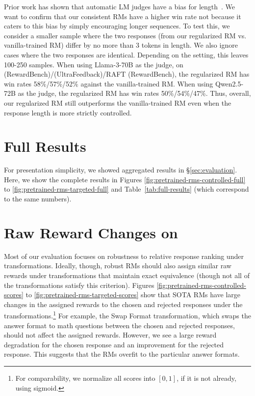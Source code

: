 Prior work has shown that automatic LM judges have a bias for length~\citep{wang2023how,singhal2023long}. We want to confirm that our consistent RMs have a higher win rate not because it caters to this bias by simply encouraging longer sequences.
To test this, we consider a smaller sample where the two responses (from our regularized RM vs. vanilla-trained RM) differ by no more than 3 tokens in length.
We also ignore cases where the two responses are identical.
Depending on the setting, this leaves 100-250 samples.
When using Llama-3-70B as the judge, on \bon (RewardBench)/\bon (UltraFeedback)/RAFT (RewardBench), the regularized RM has win rates 58\%/57\%/52\% against the vanilla-trained RM.
When using Qwen2.5-72B as the judge, the regularized RM has win rates 50\%/54\%/47\%.
Thus, overall, our regularized RM still outperforms the vanilla-trained RM even when the response length is more strictly controlled.

\section{Full \benchmark Results} \label{sec:full-results}

For presentation simplicity, we showed aggregated results in \S\ref{sec:evaluation}. Here, we show the complete results in Figures \ref{fig:pretrained-rms-controlled-full} to \ref{fig:pretrained-rms-targeted-full} and Table~\ref{tab:full-results} (which correspond to the same numbers).

\section{Raw Reward Changes on \benchmark} \label{sec:score-changes}

Most of our evaluation focuses on robustness to relative response ranking under \benchmark transformations.
Ideally, though, robust RMs should also assign similar raw rewards under transformations that maintain exact equivalence (though not all of the \benchmark transformations satisfy this criterion).
Figures \ref{fig:pretrained-rms-controlled-scores} to \ref{fig:pretrained-rms-targeted-scores} show that SOTA RMs have large changes in the assigned rewards to the chosen and rejected responses under the transformations.\footnote{For comparability, we normalize all scores into $[0, 1]$, if it is not already, using sigmoid.}
For example, the Swap Format transformation, which swaps the answer format to math questions between the chosen and rejected responses, should not affect the assigned rewards. However, we see a large reward degradation for the chosen response and an improvement for the rejected response. This suggests that the RMs overfit to the particular answer formats.


